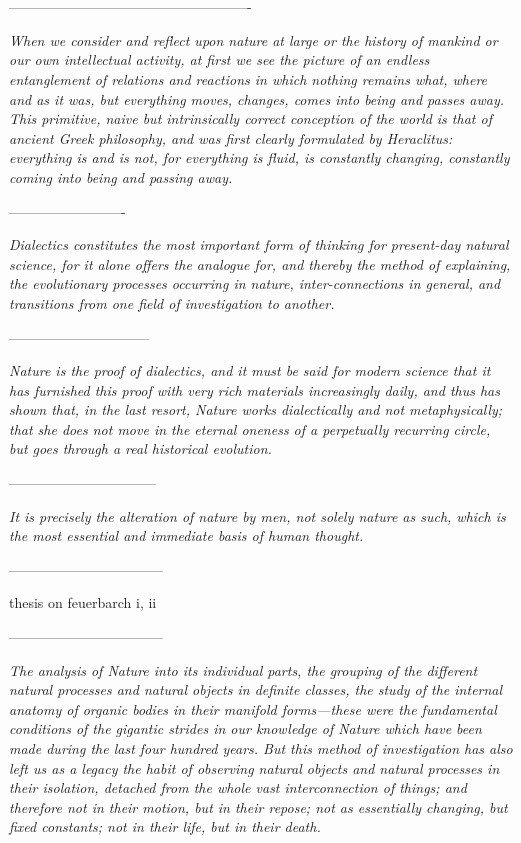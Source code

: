 \chapter*{}


----------------------------------------------------

\textit{When we consider and reflect upon nature at large or the history of mankind or our own intellectual activity, at first we see the picture of an endless entanglement of relations and reactions in which nothing remains what, where and as it was, but everything moves, changes, comes into being and passes away. This primitive, naive but intrinsically correct conception of the world is that of ancient Greek philosophy, and was first clearly formulated by Heraclitus: everything is and is not, for everything is fluid, is constantly changing, constantly coming into being and passing away.}

-------------------------

\textit{Dialectics constitutes the most important form of thinking for present-day natural science, for it alone offers the analogue for, and thereby the method of explaining, the evolutionary processes occurring in nature, inter-connections in general, and transitions from one field of investigation to another.}

------------------------------

\textit{Nature is the proof of dialectics, and it must be said for modern science that it has furnished this proof with very rich materials increasingly daily, and thus has shown that, in the last resort, Nature works dialectically and not metaphysically; that she does not move in the eternal oneness of a perpetually recurring circle, but goes through a real historical evolution.}

--------------------------------

\textit{It is precisely the alteration of nature by men, not solely nature as such, which is the most essential and immediate basis of human thought.}

---------------------------------

thesis on feuerbarch i, ii

---------------------------------

\textit{The analysis of Nature into its individual parts, the grouping of the different natural processes and natural objects in definite classes, the study of the internal anatomy of organic bodies in their manifold forms—these were the fundamental conditions of the gigantic strides in our knowledge of Nature which have been made during the last four hundred years. But this method of investigation has also left us as a legacy the habit of observing natural objects and natural processes in their isolation, detached from the whole vast interconnection of things; and therefore not in their motion, but in their repose; not as essentially changing, but fixed constants; not in their life, but in their death. }


